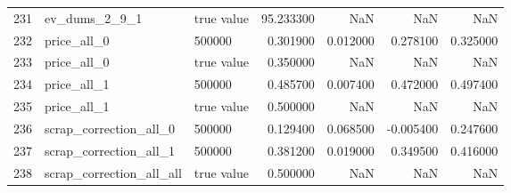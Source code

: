 \begin{tabular}{lllrrrr}
231 & ev_dums_2_9_1 & true value & 95.233300 & NaN & NaN & NaN \\
232 & price_all_0 & 500000 & 0.301900 & 0.012000 & 0.278100 & 0.325000 \\
233 & price_all_0 & true value & 0.350000 & NaN & NaN & NaN \\
234 & price_all_1 & 500000 & 0.485700 & 0.007400 & 0.472000 & 0.497400 \\
235 & price_all_1 & true value & 0.500000 & NaN & NaN & NaN \\
236 & scrap_correction_all_0 & 500000 & 0.129400 & 0.068500 & -0.005400 & 0.247600 \\
237 & scrap_correction_all_1 & 500000 & 0.381200 & 0.019000 & 0.349500 & 0.416000 \\
238 & scrap_correction_all_all & true value & 0.500000 & NaN & NaN & NaN \\
\bottomrule
\end{tabular}
